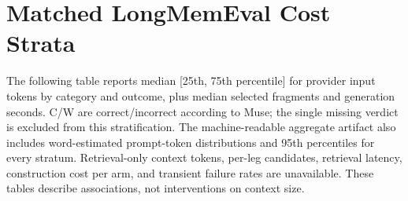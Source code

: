 \documentclass[11pt,a4paper]{article}
\begin{document}
\FloatBarrier
\section{Matched LongMemEval Cost Strata}
\label{app:lme-cost-strata}
The following table reports median [25th, 75th percentile] for provider input tokens by category and outcome, plus median selected fragments and generation seconds. C/W are correct/incorrect according to Muse; the single missing verdict is excluded from this stratification. The machine-readable aggregate artifact also includes word-estimated prompt-token distributions and 95th percentiles for every stratum. Retrieval-only context tokens, per-leg candidates, retrieval latency, construction cost per arm, and transient failure rates are unavailable. These tables describe associations, not interventions on context size.
\small
\end{document}
